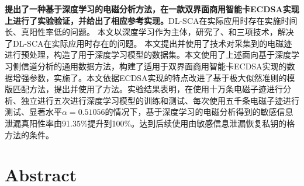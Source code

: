 \textbf{提出了一种基于深度学习的电磁分析方法，在一款双界面商用智能卡ECDSA实现上进行了实验验证，并给出了相应参考实现。}DL-SCA在实际应用时存在实施时间长、真阳性率低的问题。%
本文以深度学习作为主体，研究了\yuchuli、\shujuzengqiang 和\jiashejianyanguji 三项技术，解决了DL-SCA在实际应用时存在的问题。
本文提出并使用了\yuchuli 技术对采集到的电磁迹进行预处理，构造了用于深度学习模型的数据集。本文使用了上述面向基于深度学习侧信道分析的通用数据方法，构建了适用于双界面商用智能卡ECDSA实现的数据增强参数，实施了\shujuzengqiang。本文依据ECDSA实现的特点改进了基于极大似然准则的模版匹配方法，提出并使用了\jiashejianyanguji 方法。实验结果表明，在使用十万条电磁子迹进行分析、独立进行五次进行深度学习模型的训练和测试、每次使用五千条电磁子迹进行测试、显著水平$\alpha=0.51056$的情况下，基于深度学习的电磁分析得到的敏感信息泄漏真阳性率由91.35\%提升到100\%。达到后续使用由敏感信息泄漏恢复私钥的格方法的条件。

\intobmk\chapter*{Abstract}%

